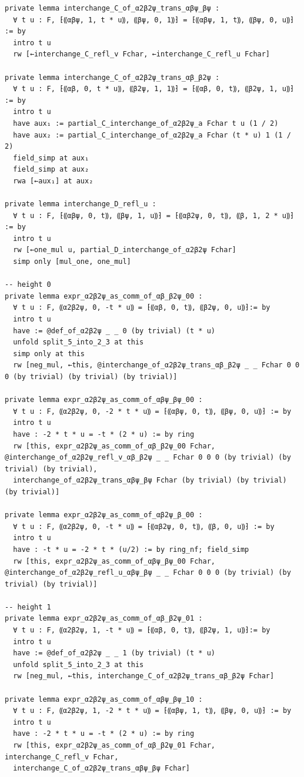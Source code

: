 \begin{Verbatim}
private lemma interchange_C_of_α2β2ψ_trans_αβψ_βψ :
  ∀ t u : F, ⁅⸨αβψ, 1, t * u⸩, ⸨βψ, 0, 1⸩⁆ = ⁅⸨αβψ, 1, t⸩, ⸨βψ, 0, u⸩⁆ := by
  intro t u
  rw [←interchange_C_refl_v Fchar, ←interchange_C_refl_u Fchar]

private lemma interchange_C_of_α2β2ψ_trans_αβ_β2ψ :
  ∀ t u : F, ⁅⸨αβ, 0, t * u⸩, ⸨β2ψ, 1, 1⸩⁆ = ⁅⸨αβ, 0, t⸩, ⸨β2ψ, 1, u⸩⁆ := by
  intro t u
  have aux₁ := partial_C_interchange_of_α2β2ψ_a Fchar t u (1 / 2)
  have aux₂ := partial_C_interchange_of_α2β2ψ_a Fchar (t * u) 1 (1 / 2)
  field_simp at aux₁
  field_simp at aux₂
  rwa [←aux₁] at aux₂

private lemma interchange_D_refl_u :
  ∀ t u : F, ⁅⸨αβψ, 0, t⸩, ⸨βψ, 1, u⸩⁆ = ⁅⸨αβ2ψ, 0, t⸩, ⸨β, 1, 2 * u⸩⁆ := by
  intro t u
  rw [←one_mul u, partial_D_interchange_of_α2β2ψ Fchar]
  simp only [mul_one, one_mul]

-- height 0
private lemma expr_α2β2ψ_as_comm_of_αβ_β2ψ_00 :
  ∀ t u : F, ⸨α2β2ψ, 0, -t * u⸩ = ⁅⸨αβ, 0, t⸩, ⸨β2ψ, 0, u⸩⁆:= by
  intro t u
  have := @def_of_α2β2ψ _ _ 0 (by trivial) (t * u)
  unfold split_5_into_2_3 at this
  simp only at this
  rw [neg_mul, ←this, @interchange_of_α2β2ψ_trans_αβ_β2ψ _ _ Fchar 0 0 0 (by trivial) (by trivial) (by trivial)]

private lemma expr_α2β2ψ_as_comm_of_αβψ_βψ_00 :
  ∀ t u : F, ⸨α2β2ψ, 0, -2 * t * u⸩ = ⁅⸨αβψ, 0, t⸩, ⸨βψ, 0, u⸩⁆ := by
  intro t u
  have : -2 * t * u = -t * (2 * u) := by ring
  rw [this, expr_α2β2ψ_as_comm_of_αβ_β2ψ_00 Fchar, @interchange_of_α2β2ψ_refl_v_αβ_β2ψ _ _ Fchar 0 0 0 (by trivial) (by trivial) (by trivial),
  interchange_of_α2β2ψ_trans_αβψ_βψ Fchar (by trivial) (by trivial) (by trivial)]

private lemma expr_α2β2ψ_as_comm_of_αβ2ψ_β_00 :
  ∀ t u : F, ⸨α2β2ψ, 0, -t * u⸩ = ⁅⸨αβ2ψ, 0, t⸩, ⸨β, 0, u⸩⁆ := by
  intro t u
  have : -t * u = -2 * t * (u/2) := by ring_nf; field_simp
  rw [this, expr_α2β2ψ_as_comm_of_αβψ_βψ_00 Fchar, @interchange_of_α2β2ψ_refl_u_αβψ_βψ _ _ Fchar 0 0 0 (by trivial) (by trivial) (by trivial)]

-- height 1
private lemma expr_α2β2ψ_as_comm_of_αβ_β2ψ_01 :
  ∀ t u : F, ⸨α2β2ψ, 1, -t * u⸩ = ⁅⸨αβ, 0, t⸩, ⸨β2ψ, 1, u⸩⁆:= by
  intro t u
  have := @def_of_α2β2ψ _ _ 1 (by trivial) (t * u)
  unfold split_5_into_2_3 at this
  rw [neg_mul, ←this, interchange_C_of_α2β2ψ_trans_αβ_β2ψ Fchar]

private lemma expr_α2β2ψ_as_comm_of_αβψ_βψ_10 :
  ∀ t u : F, ⸨α2β2ψ, 1, -2 * t * u⸩ = ⁅⸨αβψ, 1, t⸩, ⸨βψ, 0, u⸩⁆ := by
  intro t u
  have : -2 * t * u = -t * (2 * u) := by ring
  rw [this, expr_α2β2ψ_as_comm_of_αβ_β2ψ_01 Fchar, interchange_C_refl_v Fchar,
  interchange_C_of_α2β2ψ_trans_αβψ_βψ Fchar]


\end{Verbatim}
